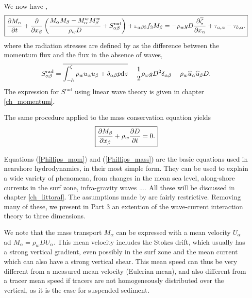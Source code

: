We now have \citep{Smith2006b}, 
\begin{equation}
\fbox{$\displaystyle \frac{\partial M_\alpha }{\partial t} + \frac{\partial }{\partial x_\beta} \left( \frac{M_\alpha M_\beta-M_\alpha^w M_\beta^w}{\rho_w D} 
+ S^{\mathrm{rad}}_{\alpha \beta}\right) +\varepsilon_{\alpha \beta 3} f_3 M_\beta  = -\rho_w g D \frac{\partial \overline{\zeta}}{\partial x_\alpha} + \tau_{a,\alpha} - \tau_{b,\alpha}.$}\label{Phillips_mom}
\end{equation}
where the radiation stresses are defined by \cite{Phillips1977} as the difference between the momentum flux and the flux in the absence of waves, 
\begin{equation}
    S^{\mathrm{rad}}_{\alpha \beta}=\overline{\int_{-h}^\zeta \rho_w u_\alpha u_\beta +\delta_{\alpha \beta}  p \mathrm{d}z }
    -\frac{1}{2} \rho_w g D^2 \delta_{\alpha \beta}  - \rho_w \widehat{u}_\alpha \widehat{u}_\beta D. \label{Srad_def_Phillips}
\end{equation}
The expression for $S^{\mathrm{rad}}$ using linear wave theory is given in chapter \ref{ch_momentum}.

The same procedure applied to the mass conservation equation yields 
\begin{equation}
\fbox{$\displaystyle \frac{\partial M_\beta }{\partial x_\beta} + \rho_w \frac{\partial D}{\partial t}=0.$}\label{Phillips_mass}
\end{equation}

Equations (\ref{Phillips_mom}) and (\ref{Phillips_mass}) are the basic equations used in nearshore hydrodynamics, in their most 
simple form. They can be used to explain a wide variety of phenomena, from changes in the mean sea level, along-shore currents in the 
surf zone, infra-gravity waves ....  All these will be discussed in chapter \ref{ch_littoral}. The assumptions made by 
 \cite{Phillips1977} are fairly restrictive. Removing many of these, we present in Part 3 an extention of the wave-current interaction theory to three dimensions. 

We note that the mass transport $M_\alpha$ can be expressed with a mean velocity $U_\alpha$ ad $M_\alpha=\rho_w D U_\alpha$. 
This mean velocity includes the Stokes drift, which usually has a strong vertical gradient, even possibly in the surf zone  \citep{Ardhuin&al.2008}
and the mean current which can also have a strong vertical shear. 
This mean speed can thus be very different from a measured mean velocity (Eulerian mean), 
and also different from a tracer mean speed if tracers are not homogeneously 
distributed over the vertical, as it is the case for suspended sediment. 




